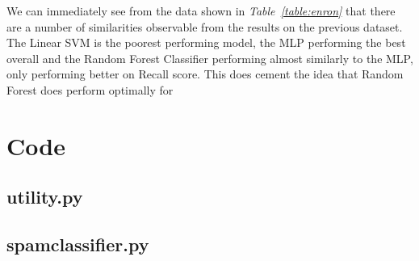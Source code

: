 \documentclass[11pt, a4paper]{article}
\begin{document}
We can immediately see from the data shown in \emph{Table~\ref{table:enron}} that there are a number of similarities observable from the results on the previous dataset. The Linear SVM is the poorest performing model, the MLP performing the best overall and the Random Forest Classifier performing almost similarly to the MLP, only performing better on Recall score. This does cement the idea that Random Forest does perform optimally for  

\newpage


\newpage

\appendix


\section{Code}

\subsection{utility.py}

\newpage
\subsection{spam\textunderscore classifier.py}

\end{document}
